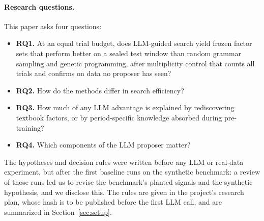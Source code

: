 \paragraph{Research questions.} This paper asks four questions:
\begin{itemize}
  \item \textbf{RQ1.} At an equal trial budget, does LLM-guided search yield
    frozen factor sets that perform better on a sealed test window than random
    grammar sampling and genetic programming, after multiplicity control that
    counts all trials and confirms on data no proposer has seen?
  \item \textbf{RQ2.} How do the methods differ in search efficiency?
  \item \textbf{RQ3.} How much of any LLM advantage is explained by
    rediscovering textbook factors, or by period-specific knowledge absorbed
    during pre-training?
  \item \textbf{RQ4.} Which components of the LLM proposer matter?
\end{itemize}
The hypotheses and decision rules were written before any LLM or real-data
experiment, but after the first baseline runs on the synthetic benchmark: a
review of those runs led us to revise the benchmark's planted signals and the
synthetic hypothesis, and we disclose this. The rules are given in the
project's research plan, whose hash is to be published before the first LLM
call, and are summarized in Section~\ref{sec:setup}.

